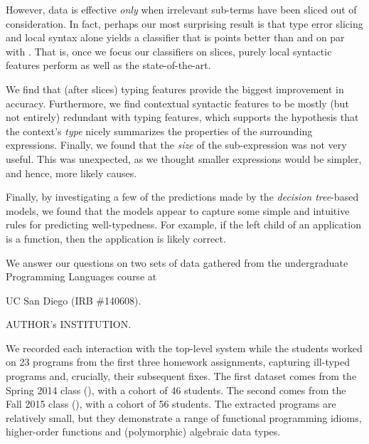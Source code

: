 {}
%
However, data is effective \emph{only}
when irrelevant sub-terms have been
sliced out of consideration.
%
In fact, perhaps our most surprising
result is that type error slicing and
local syntax alone yields
a classifier that is \SlicingWinOcaml points
better than \ocaml and on par with
\sherrloc.
%
That is, once we focus our classifiers on
slices, purely local syntactic features
perform as well as the
state-of-the-art.

{}
%
We find that (after slices)
typing features
provide the biggest
improvement in accuracy.
%
Furthermore, we find contextual syntactic
features to be mostly (but not entirely)
redundant with typing features,
which supports the hypothesis that
the context's \emph{type} nicely
summarizes the properties of the
surrounding expressions.
%
Finally, we found that the \emph{size}
of the sub-expression was not very useful.
This was unexpected, as we thought
smaller expressions would be simpler, and
hence, more likely causes.

{}
%
Finally, by investigating a few of the
predictions made by the \emph{decision tree}-based
models, we found that the models
appear to capture some simple and intuitive
rules for predicting well-typedness.
%
For example, if the left child of an application
is a function, then the application is likely
correct.

%


\label{sec:methodology}

We answer our questions on two sets of data gathered from the
undergraduate Programming Languages course at
\begin{anonsuppress}
UC San Diego (IRB \#140608).
\end{anonsuppress}
\begin{noanonsuppress}
AUTHOR's INSTITUTION.
\end{noanonsuppress}
%
We recorded each interaction with the \ocaml top-level system while the
students worked on 23 programs from the first three homework
assignments, capturing ill-typed programs and, crucially, their
subsequent fixes.
%
The first dataset comes from the Spring 2014 class (\SPRING), with a
cohort of 46 students. The second comes from the Fall 2015 class
(\FALL), with a cohort of 56 students.
%
The extracted programs are relatively small, but they demonstrate a
range of functional programming idioms, \eg higher-order functions and
(polymorphic) algebraic data types.

